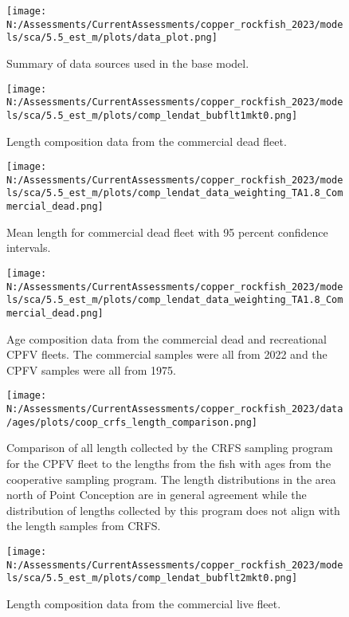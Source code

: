 \documentclass[11pt,
  english,
  letterpaper,
]{article}
\begin{document}
\begin{figure}
\centering
\texttt{[image: N:/Assessments/CurrentAssessments/copper\_rockfish\_2023/models/sca/5.5\_est\_m/plots/data\_plot.png]}
\caption{Summary of data sources used in the base model.\label{fig:data-plot}}
\end{figure}

\begin{figure}
\centering
\texttt{[image: N:/Assessments/CurrentAssessments/copper\_rockfish\_2023/models/sca/5.5\_est\_m/plots/comp\_lendat\_bubflt1mkt0.png]}
\caption{Length composition data from the commercial dead fleet.\label{fig:com-dead-len-data}}
\end{figure}

\begin{figure}
\centering
\texttt{[image: N:/Assessments/CurrentAssessments/copper\_rockfish\_2023/models/sca/5.5\_est\_m/plots/comp\_lendat\_data\_weighting\_TA1.8\_Commercial\_dead.png]}
\caption{Mean length for commercial dead fleet with 95 percent confidence intervals.\label{fig:mean-com-dead-len-data}}
\end{figure}

\begin{figure}
\centering
\texttt{[image: N:/Assessments/CurrentAssessments/copper\_rockfish\_2023/models/sca/5.5\_est\_m/plots/comp\_lendat\_data\_weighting\_TA1.8\_Commercial\_dead.png]}
\caption{Age composition data from the commercial dead and recreational CPFV fleets. The commercial samples were all from 2022 and the CPFV samples were all from 1975.\label{fig:com-dead-age-data}}
\end{figure}

\begin{figure}
\centering
\texttt{[image: N:/Assessments/CurrentAssessments/copper\_rockfish\_2023/data/ages/plots/coop\_crfs\_length\_comparison.png]}
\caption{Comparison of all length collected by the CRFS sampling program for the CPFV fleet to the lengths from the fish with ages from the cooperative sampling program. The length distributions in the area north of Point Conception are in general agreement while the distribution of lengths collected by this program does not align with the length samples from CRFS.\label{fig:coop-len-comparison}}
\end{figure}

\begin{figure}
\centering
\texttt{[image: N:/Assessments/CurrentAssessments/copper\_rockfish\_2023/models/sca/5.5\_est\_m/plots/comp\_lendat\_bubflt2mkt0.png]}
\caption{Length composition data from the commercial live fleet.\label{fig:com-live-len-data}}
\end{figure}
\end{document}
